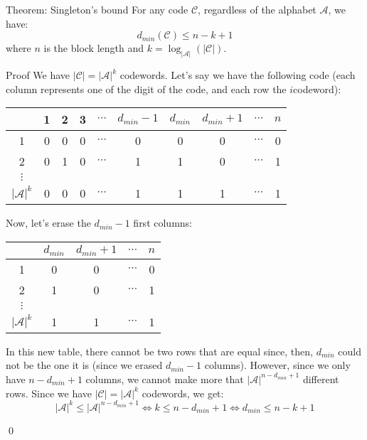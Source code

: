 \documentclass[a4paper]{article}
\begin{document}
\begin{parag}{Theorem: Singleton's bound}
    For any code $\mathcal{C}$, regardless of the alphabet $\mathcal{A}$, we have:
    \[d_{min}\left(\mathcal{C}\right) \leq n -k + 1\]
    where $n$ is the block length and $k = \log_{\left|\mathcal{A}\right|}\left(\left|\mathcal{C}\right|\right)$.

    \begin{subparag}{Proof}
        We have $\left|\mathcal{C}\right| = \left|\mathcal{A}\right|^k$ codewords. Let's say we have the following code (each column represents one of the digit of the code, and each row the $i$\Th codeword):
        \begin{center}
        \begin{tabular}{c|ccccccccc}
            & 1 & 2 & 3 & $\cdots$ & $d_{min} -1$ & $d_{min}$ & $d_{min} + 1$ & $\cdots$ & $n$ \\
            \hline
            1 & 0 & 0 & 0 & $\cdots$ & 0 & 0 & 0 & $\cdots$ & 0 \\
            2 & 0 & 1 & 0 & $\cdots$ & 1 & 1 & 0 & $\cdots$ & 1 \\
            $\vdots$ \\
            $\left|\mathcal{A}\right|^k$ & 0 & 0 & 0 & $\cdots$ & 1 & 1 & 1 & $\cdots$ & 1
        \end{tabular}
        \end{center}

        Now, let's erase the $d_{min} - 1$ first columns:
        \begin{center}
        \begin{tabular}{c|cccc}
            & $d_{min}$ & $d_{min} + 1$ & $\cdots$ & $n$ \\
            \hline
            1 & 0 & 0 & $\cdots$ & 0 \\
            2 & 1 & 0 & $\cdots$ & 1 \\
            $\vdots$ \\
            $\left|\mathcal{A}\right|^k$ & 1 & 1 & $\cdots$ & 1
        \end{tabular}
        \end{center}

        In this new table, there cannot be two rows that are equal since, then, $d_{min}$ could not be the one it is (since we erased $d_{min} - 1$ columns). However, since we only have $n - d_{min} + 1$ columns, we cannot make more that $\left|\mathcal{A}\right|^{n - d_{min} + 1}$ different rows. Since we have $\left|\mathcal{C}\right| = \left|\mathcal{A}\right|^k$ codewords, we get:
        \[\left|\mathcal{A}\right|^k \leq \left|\mathcal{A}\right|^{n - d_{min} + 1} \iff k \leq n - d_{min} + 1 \iff d_{min} \leq n - k + 1\]

        \qed
    \end{subparag}

\end{parag}
\end{document}
